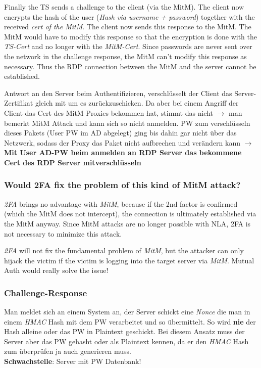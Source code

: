Finally the TS sends a challenge to the client (via the MitM). The client now encrypts the hash of the user (\textit{Hash via username + password}) together with the received \textit{cert of the MitM}. The client now sends this response to the MitM. The MitM would have to modify this response so that the encryption is done with the \textit{TS-Cert} and no longer with the \textit{MitM-Cert}. Since passwords are never sent over the network in the challenge response, the MitM can't modify this response as necessary. Thus the RDP connection between the MitM and the server cannot be established.

Antwort an den Server beim Authentifizieren, verschlüsselt der Client das Server-Zertifikat gleich mit um es zurückzuschicken.
Da aber bei einem Angriff der Client das Cert des MitM Proxies bekommen hat, stimmt das nicht $\rightarrow$ man bemerkt MitM Attack und kann sich so nicht anmelden. 
PW zum verschlüsseln dieses Pakets (User PW im AD abgelegt) ging bis dahin gar nicht über das Netzwerk, sodass der Proxy das Paket nicht aufbrechen und verändern kann
$\rightarrow$ \textbf{Mit User AD-PW beim anmelden an RDP Server das bekommene Cert des RDP Server mitverschlüsseln}

\subsubsection{Would 2FA fix the problem of this kind of MitM attack?}
\textit{2FA} brings no advantage with \textit{MitM}, because if the 2nd factor is confirmed (which the MitM does not intercept), the connection is ultimately established via the MitM anyway. Since MitM attacks are no longer possible with NLA, 2FA is not necessary to minimize this attack.

\textit{2FA} will not fix the fundamental problem of \textit{MitM}, but the attacker can only hijack the victim if the victim is logging into the target server via \textit{MitM}. Mutual Auth would really solve the issue!

\subsubsection{Challenge-Response}
Man meldet sich an einem System an, der Server schickt eine \textit{Nonce} die man in einem \textit{HMAC} Hash mit dem PW verarbeitet und so übermittelt.
So wird \textbf{nie} der Hash alleine oder das PW in Plaintext geschickt. 
Bei diesem Ansatz muss der Server aber das PW gehasht oder als Plaintext kennen, da er den \textit{HMAC} Hash zum überprüfen ja auch generieren muss.\\
\textbf{Schwachstelle}: Server mit PW Datenbank!\\

